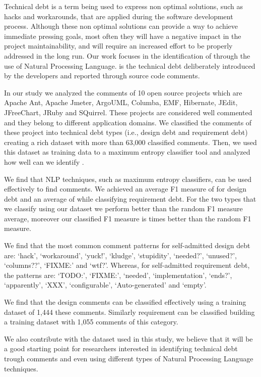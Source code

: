 Technical debt is a term being used to express non optimal solutions, such as hacks and workarounds, that are applied during the software development process. 
Although these non optimal solutions can provide a way to achieve immediate pressing goals, most often they will have a negative impact in the project maintainability, and will require an increased effort to be properly addressed in the long run. Our work focuses in the identification of \SATD through the use of Natural Processing Language. \SATD is the technical debt deliberately introduced by the developers and reported through source code comments.

In our study we analyzed the comments of 10 open source projects which are Apache Ant, Apache Jmeter, ArgoUML, Columba, EMF, Hibernate, JEdit, JFreeChart, JRuby and SQuirrel. These projects are considered well commented and they belong to different application domains. We classified the comments of these project into technical debt types (i.e., design debt and requirement debt) creating a rich dataset with more than 63,000 classified comments. Then, we used this dataset as training data to a maximum entropy classifier tool and analyzed how well can we identify \SATD.

We find that NLP techniques, such as maximum entropy classifiers, can be used effectively to find \SATD comments. We achieved an average F1 measure of \todo{} for design debt and an average of \todo{} while classifying requirement debt. For the two types that we classify using our dataset we perform better than the random F1 measure average, moreover our classified F1 measure is \todo{} times better than the random F1 measure.

We find that the most common comment patterns for self-admitted design debt are: `hack', `workaround', `yuck!', `kludge', `stupidity', `needed?', `unused?', `columns??', `FIXME:' and `wtf?'. Whereas, for self-admitted requirement debt, the patterns are: `TODO:', `FIXME:', `needed', `implementation', `ends?', `apparently', `XXX', `configurable', `Auto-generated' and `empty'.

We find that the design \SATD comments can be classified effectively using a training dataset of 1,444 these comments. Similarly requirement \SATD can be classified building a training dataset with 1,055 comments of this category.

We also contribute with the dataset used in this study, we believe that it will be a good starting point for researchers interested in identifying technical debt trough comments and even using different types of Natural Processing Language techniques. 